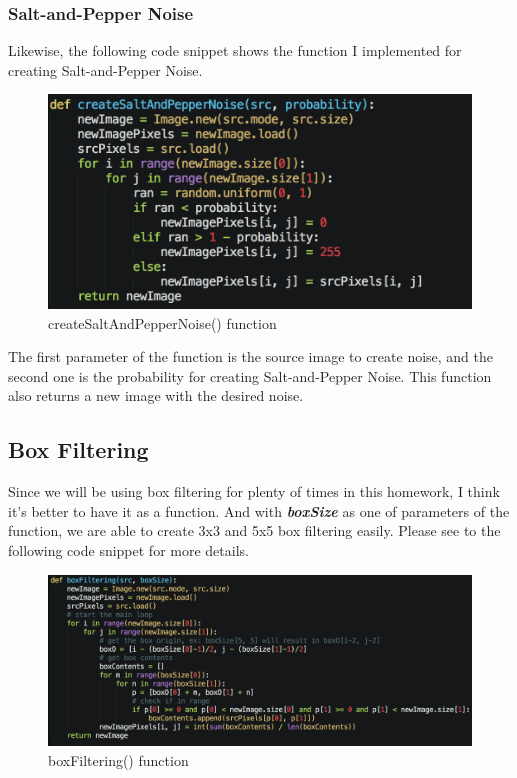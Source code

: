 \documentclass{article}
\begin{document}
\subsubsection{Salt-and-Pepper Noise}
Likewise, the following code snippet shows the function I implemented for creating Salt-and-Pepper Noise.
\begin{figure}[H]
  \includegraphics[width=\linewidth]{img/create_salt_and_pepper_noise.png}
  \caption{createSaltAndPepperNoise() function}
  \label{fig:create_saltandpepper_noise}
\end{figure}
The first parameter of the function is the source image to create noise, and the second one is the probability for creating Salt-and-Pepper Noise. This function also returns a new image with the desired noise.

\subsection{Box Filtering}
Since we will be using box filtering for plenty of times in this homework, I think it's better to have it as a function. And with \textit{\textbf{boxSize}} as one of parameters of the function, we are able to create 3x3 and 5x5 box filtering easily. Please see to the following code snippet for more details.
\begin{figure}[H]
  \includegraphics[width=\linewidth]{img/box_filtering.png}
  \caption{boxFiltering() function}
  \label{fig:box_filtering}
\end{figure}
\end{document}
